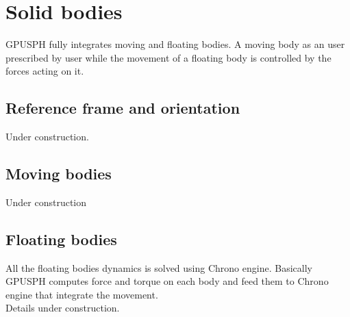 \documentclass{../GPUSPHtemplate}
\begin{document}
\section{Solid bodies}
GPUSPH fully integrates moving and floating bodies. A moving body as an user prescribed
by user while the movement of a floating body is controlled by the forces acting on it.\\

\subsection{Reference frame and orientation}
Under construction.

\subsection{Moving bodies}
Under construction

\subsection{Floating bodies}
All the floating bodies dynamics is solved using Chrono engine. Basically GPUSPH computes force and torque 
on each body and feed them to Chrono engine that integrate the movement.\\
Details under construction.


\end{document}
